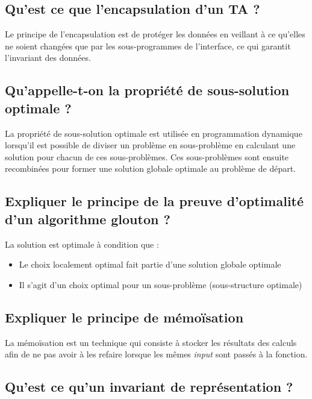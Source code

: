 \documentclass[11pt]{article}
\begin{document}
\subsection{Qu'est ce que l'encapsulation d'un TA ?}

Le principe de l’encapsulation est de protéger les données en veillant à ce qu’elles ne soient changées que par les sous-programmes de l’interface, ce qui garantit l’invariant des données.

\subsection{Qu'appelle-t-on la propriété de sous-solution optimale ?}

La propriété de sous-solution optimale est utilisée en programmation dynamique lorsqu'il est possible de diviser un problème en sous-problème en calculant une solution pour chacun de ces sous-problèmes. Ces sous-problèmes sont ensuite recombinées pour former une solution globale optimale au problème de départ.

\subsection{Expliquer le principe de la preuve d'optimalité d'un algorithme glouton ?}

La solution est optimale à condition que :

\begin{itemize}
	\item Le choix localement optimal fait partie d'une solution globale optimale
	\item Il s'agit d'un choix optimal pour un sous-problème (sous-structure optimale)
\end{itemize}

\subsection{Expliquer le principe de mémoïsation}

La mémoïsation est un technique qui consiste à stocker les résultats des calculs afin de ne pas avoir à les refaire lorsque les mêmes \emph{input} sont passés à la fonction.

\subsection{Qu'est ce qu'un invariant de représentation ?}
\end{document}
